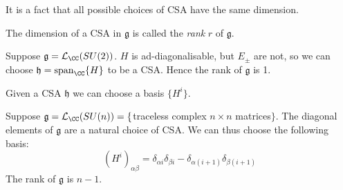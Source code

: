 \documentclass{jknotes}
\begin{document}
It is a fact that all possible choices of CSA have the same dimension.
\begin{defn}
    The dimension of a CSA in \(\mathfrak{g}\) is called the \emph{rank} \(r\) of \(\mathfrak{g}\).
\end{defn}
\begin{eg}
    Suppose \(\mathfrak{g}=\mathcal{L}_\CC(SU(2))\). \(H\) is ad-diagonalisable, but \(E_\pm\) are not, so we can choose \(\mathfrak{h} = \operatorname{span}_\CC\{H\}\) to be a CSA. Hence the rank of \(\mathfrak{g}\) is 1.
\end{eg}

Given a CSA \(\mathfrak{h}\) we can choose a basis \(\{H^i\}\).

\begin{eg}
    Suppose \(\mathfrak{g}=\mathcal{L}_\CC(SU(n))=\{\)traceless complex \(n\times n\) matrices\(\}\). The diagonal elements of \(\mathfrak{g}\) are a natural choice of CSA. We can thus choose the following basis:
    \begin{equation}
        (H^i)_{\alpha\beta} = \delta_{\alpha i}\delta_{\beta i} - \delta_{\alpha (i+1)}\delta_{\beta (i+1)}
    \end{equation}
    The rank of \(\mathfrak{g}\) is \(n-1\).
\end{eg}
\end{document}
